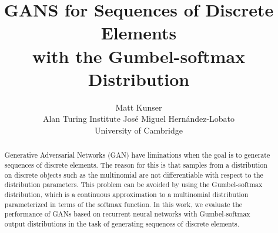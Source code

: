 \documentclass{article}
\title{GANS for Sequences of Discrete Elements \\with the Gumbel-softmax Distribution}
\author{
    Matt Kunser\\
    Alan Turing Institute
    \And
    Jos\'e Miguel Hern\'andez-Lobato\\
    University of Cambridge
}
\begin{document}

\maketitle

\begin{abstract}
Generative Adversarial Networks (GAN) have liminations when the goal is to
generate sequences of discrete elements. The reason for this is that
samples from a distribution on discrete objects such as the multinomial are
not differentiable with respect to the distribution parameters. This problem
can be avoided by using the Gumbel-softmax distribution, which is a continuous
approximation to a multinomial distribution parameterized in terms of the
softmax function. In this work, we evaluate the performance of GANs based on
recurrent neural networks with Gumbel-softmax output distributions in the task
of generating sequences of discrete elements.
\end{abstract}








\end{document}

